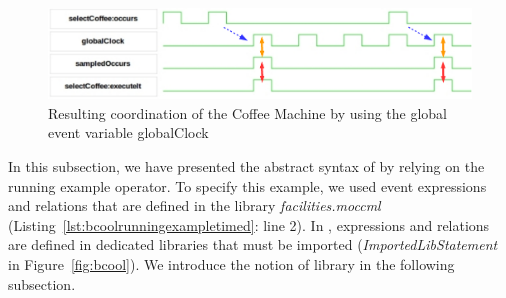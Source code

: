 		\begin{figure}[h]
			\center
			\includegraphics[width=.9\textwidth]{bcool/figs/runningeventvar}
			\caption{Resulting coordination of the Coffee Machine by using the global event variable globalClock}
			\label{fig:runningeventvar}
		\end{figure}



In this subsection, we have presented the abstract syntax of \bcool by relying on the running example operator. To specify this example, we used event expressions and relations that are defined in the library \emph{facilities.moccml} (Listing~\ref{lst:bcoolrunningexampletimed}: line 2). In \bcool, expressions and relations are defined in dedicated libraries that must be imported (\emph{ImportedLibStatement} in Figure~\ref{fig:bcool}). We introduce the notion of library in the following subsection.
	
	
	
	


